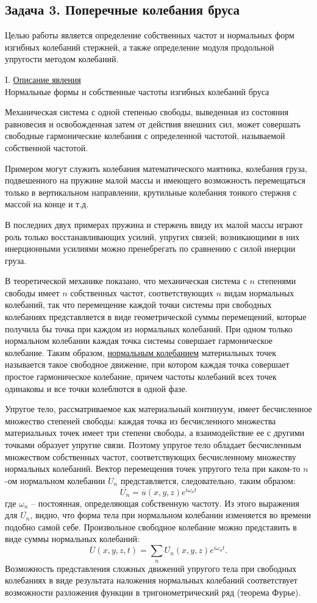 \documentclass[specialist, subf, href, colorlinks=true, 14pt, final]{disser}
\theoremstyle{definition}
\newcommand{\anonsubsection}[1]{\subsection*{#1}\addcontentsline{toc}{subsection}{#1}}
\begin{document}
\newpage
\anonsubsection{Задача 3. Поперечные колебания бруса}
Целью работы является определение собственных частот и нормальных форм изгибных колебаний стержней, а также определение модуля продольной упругости методом колебаний.

\noindent I. \underline{Описание явления}\\
Нормальные формы и собственные частоты изгибных колебаний бруса

Механическая система с одной степенью свободы, выведенная из состояния равновесия и освобожденная затем от действия внешних сил, может совершать свободные гармонические колебания с определенной частотой, называемой собственной частотой. 

Примером могут служить колебания математического маятника, колебания груза, подвешенного на пружине малой массы и имеющего возможность перемещаться только в вертикальном направлении, крутильные колебания тонкого стержня с массой на конце и т.д.

В последних двух примерах пружина и стержень ввиду их малой массы играют роль только восстанавливающих усилий, упругих связей; возникающими в них инерционными усилиями можно пренебрегать по сравнению с силой инерции груза.

В теоретической механике показано, что механическая система с $n$ степенями свободы имеет $n$ собственных частот, соответствующих $n$ видам нормальных колебаний, так что перемещение каждой точки системы при свободных колебаниях представляется в виде геометрической суммы перемещений, которые получила бы точка при каждом из нормальных колебаний. При одном только нормальном колебании каждая точка системы совершает гармоническое колебание. Таким образом, \underline{нормальным колебанием} материальных точек называется такое свободное движение, при котором каждая точка совершает простое гармоническое колебание, причем частоты колебаний всех точек одинаковы и все точки колеблются в одной фазе.

Упругое тело, рассматриваемое как материальный континуум, имеет бесчисленное множество степеней свободы: каждая точка из бесчисленного множества материальных точек имеет три степени свободы, а взаимодействие ее с другими точками образует упругие связи. Поэтому упругое тело обладает бесчисленным множеством собственных частот, соответствующих бесчисленному множеству нормальных колебаний. Вектор перемещения точек упругого тела при каком-то $n$-ом нормальном колебании $U_n$ представляется, следовательно, таким образом:
{\Large
\[
  \overline{U_n} = \overline{u}(x, y, z) e^{i\omega_{n} t}
\]
}
где $\omega_n$ -- постоянная, определяющая собственную частоту. Из 
этого выражения для $\overline{U_n}$, видно, что форма тела при нормальном колебании изменяется во времени подобно самой себе. Произвольное свободное колебание можно представить в виде суммы нормальных колебаний:
{\Large
\[
  \overline{U}(x,y,z,t) = \sum\limits_{n}\overline{U_n}(x,y,z) e^{i\omega_{n} t}.
\]
}
Возможность представления сложных движений упругого тела при свободных колебаниях в виде результата наложения нормальных колебаний соответствует возможности разложения функции в тригонометрический ряд (теорема Фурье).
\end{document}
